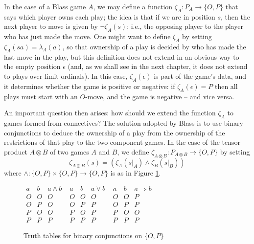 \documentclass[11pt]{article} %
\theoremstyle{plain} %
\theoremstyle{definition} %
\theoremstyle{exercisestyle}
\newcommand*\from{\colon}
\newcommand{\cmap}[3]{#1\from{}#2\to{}#3}
\newcommand{\tensor}{\otimes}
\newcommand{\OP}{\{O,P\}}
\newcommand{\emptyplay}{\epsilon}
\begin{document}
In the case of a Blass game $A$, we may define a function $\zeta_A\colon P_A\to\OP$ that says which player owns each play; the idea is that if we are in position $s$, then the next player to move is given by $\neg\zeta_A(s)$; i.e., the opposing player to the player who has just made the move.  One might want to define $\zeta_A$ by setting $\zeta_A(sa)=\lambda_A(a)$, so that ownership of a play is decided by who has made the last move in the play, but this definition does not extend in an obvious way to the empty position $\emptyplay$ (and, as we shall see in the next chapter, it does not extend to plays over limit ordinals).  In this case, $\zeta_A(\emptyplay)$ is part of the game's data, and it determines whether the game is positive or negative: if $\zeta_A(\emptyplay) = P$ then all plays must start with an $O$-move, and the game is negative -- and vice versa.

An important question then arises: how should we extend the function $\zeta_A$ to games formed from connectives?  The solution adopted by Blass is to use binary conjunctions to deduce the ownership of a play from the ownership of the restrictions of that play to the two component games.  In the case of the tensor product $A\tensor B$ of two games $A$ and $B$, we define $\cmap{\zeta_{A\tensor B}}{P_{A\tensor B}}{\OP}$ by setting
\[
  \zeta_{A\tensor B}(s) = (\zeta_A(s\vert_A) \wedge \zeta_B(s\vert_B))
  \]
where $\cmap{\wedge}{\OP\times \OP}{\OP}$ is as in Figure \ref{truthtables}.

\begin{figure}[h]
  \begin{center}
    $\begin{array}{cc|c}
      a & b & a \wedge b \\
      \hline
      O & O & O \\
      O & P & O \\
      P & O & O \\
      P & P & P
    \end{array}$
    \quad
    $\begin{array}{cc|c}
      a & b & a \vee b \\
      \hline
      O & O & O \\
      O & P & P \\
      P & O & P \\
      P & P & P
    \end{array}$
    \quad
    $\begin{array}{cc|c}
      a & b & a \Rightarrow b \\
      \hline
      O & O & P \\
      O & P & P \\
      P & O & O \\
      P & P & P
    \end{array}$
    \caption{Truth tables for binary conjunctions on $\OP$}
    \label{truthtables}
  \end{center}
\end{figure}
\end{document}
